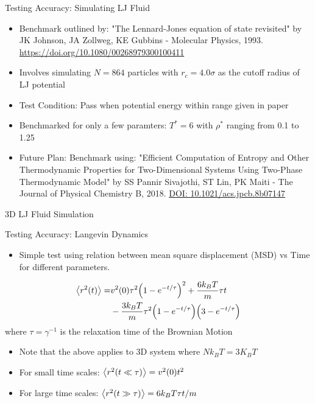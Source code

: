 \documentclass[10pt]{beamer}
\begin{document}
\begin{frame}[label={sec:org483aaa4}]{Testing Accuracy: Simulating LJ Fluid}
\begin{itemize}
\item Benchmark outlined by: "The Lennard-Jones equation of state revisited" by  JK Johnson, JA Zollweg, KE Gubbins - Molecular Physics, 1993. \href{https://www.tandfonline.com/doi/abs/10.1080/00268979300100411}{https://doi.org/10.1080/00268979300100411}
\item Involves simulating \(N=864\) particles with \(r_c = 4.0\sigma\) as the cutoff radius of LJ potential
\item Test Condition: Pass when potential energy within range given in paper
\item Benchmarked for only a few paramters: \(T^*=6\) with \(\rho^*\) ranging from 0.1 to 1.25
\item Future Plan: Benchmark using: "Efficient Computation of Entropy and Other Thermodynamic Properties for Two-Dimensional Systems Using Two-Phase Thermodynamic Model" by  SS Pannir Sivajothi, ST Lin, PK Maiti - The Journal of Physical Chemistry B, 2018. \href{https://pubs.acs.org/doi/10.1021/acs.jpcb.8b07147}{DOI: 10.1021/acs.jpcb.8b07147}
\end{itemize}
\end{frame}

\begin{frame}[label={sec:org96b9803}]{3D LJ Fluid Simulation}
\end{frame}


\begin{frame}[label={sec:org8dc81c6}]{Testing Accuracy: Langevin Dynamics}
\begin{itemize}
\item Simple test using relation between mean square displacement (MSD) vs Time for different parameters.
\end{itemize}
\begin{align*}
\expval{r^2(t)} = &v^2(0)\tau^2\pqty{1-e^{-t/\tau}}^2 + \frac{6k_BT}{m}\tau t\\
&- \frac{3k_BT}{m}\tau^2\pqty{1-e^{-t/\tau}}\pqty{3 - e^{-t/\tau}}
\end{align*}
where \(\tau = \gamma^{-1}\) is the relaxation time of the Brownian Motion
\begin{itemize}
\item Note that the above applies to 3D system where \(Nk_BT = 3K_BT\)
\item For small time scales: \(\expval{r^2(t\ll\tau)} = v^2(0)t^2\)
\item For large time scales: \(\expval{r^2(t\gg\tau)} = 6k_BT\tau t/m\)
\end{itemize}
\end{frame}
\end{document}
